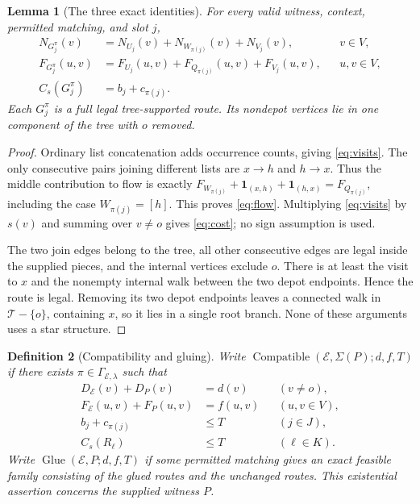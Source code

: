 \documentclass[11pt]{article}
\newtheorem{definition}{Definition}[section]
\newtheorem{lemma}[definition]{Lemma}
\theoremstyle{remark}
\newcommand{\Compat}{\operatorname{Compatible}}
\newcommand{\Glue}{\operatorname{Glue}}
\begin{document}
\begin{lemma}[The three exact identities]
\label{lem:identities}
For every valid witness, context, permitted matching, and slot $j$,
\begin{align}
 N_{G_j^\pi}(v)&=N_{U_j}(v)+N_{W_{\pi(j)}}(v)+N_{V_j}(v),
                    && v\in V,\label{eq:visits}\\
 F_{G_j^\pi}(u,v)&=F_{U_j}(u,v)+F_{Q_{\pi(j)}}(u,v)+F_{V_j}(u,v),
                    && u,v\in V,\label{eq:flow}\\
 C_s(G_j^\pi)&=b_j+c_{\pi(j)}.\label{eq:cost}
\end{align}
Each $G_j^\pi$ is a full legal tree-supported route. Its nondepot vertices
lie in one component of the tree with $o$ removed.
\end{lemma}
\begin{proof}
Ordinary list concatenation adds occurrence counts, giving
\eqref{eq:visits}. The only consecutive pairs joining different lists are
$x\to h$ and $h\to x$. Thus the middle contribution to flow is exactly
$F_{W_{\pi(j)}}+\mathbf 1_{(x,h)}+\mathbf 1_{(h,x)}=F_{Q_{\pi(j)}}$,
including the case $W_{\pi(j)}=[h]$. This proves \eqref{eq:flow}.
Multiplying \eqref{eq:visits} by $s(v)$ and summing over $v\ne o$ gives
\eqref{eq:cost}; no sign assumption is used.

The two join edges belong to the tree, all other consecutive edges are legal
inside the supplied pieces, and the internal vertices exclude $o$. There is
at least the visit to $x$ and the nonempty internal walk between the two depot
endpoints. Hence the route is legal. Removing its two depot endpoints leaves
a connected walk in $\mathcal T-\{o\}$, containing $x$, so it lies in a
single root branch. None of these arguments uses a star structure.
\end{proof}

\begin{definition}[Compatibility and gluing]
Write $\Compat(\mathcal E,\Sigma(P);d,f,T)$ if there exists
$\pi\in\Gamma_{\mathcal E,\lambda}$ such that
\begin{align}
 D_{\mathcal E}(v)+D_P(v)&=d(v) &&(v\ne o),\label{eq:target-visits}\\
 F_{\mathcal E}(u,v)+F_P(u,v)&=f(u,v) &&(u,v\in V),\label{eq:target-flow}\\
 b_j+c_{\pi(j)}&\le T &&(j\in J),\label{eq:slot-budget}\\
 C_s(R_\ell)&\le T &&(\ell\in K).\label{eq:unchanged-budget}
\end{align}
Write $\Glue(\mathcal E,P;d,f,T)$ if some permitted matching gives an exact
feasible family consisting of the glued routes and the unchanged routes.
This existential assertion concerns the supplied witness $P$.
\end{definition}
\end{document}
